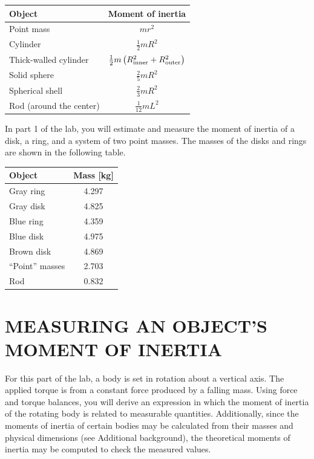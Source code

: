 \documentclass[11pt,letterpaper]{article}
\begin{document}
\renewcommand{\arraystretch}{2}
\begin{table}[h]
\begin{tabular}{|l|c|}
\hline
Object & Moment of inertia\\
\hline
Point mass & $mr^2$\\
Cylinder & $\frac{1}{2}mR^2$\\
Thick-walled cylinder & $\frac{1}{2}m\left(R_{\rm inner}^2+R_{\rm outer}^2\right)$\\
Solid sphere & $\frac{2}{5}mR^2$\\
Spherical shell & $\frac{2}{3}mR^2$\\
Rod (around the center) & $\frac{1}{12}mL^2$\\
\hline
\end{tabular}
\end{table}

In part 1 of the lab, you will estimate and measure the moment of inertia of a disk, a ring, and a system of two point masses. The masses of the disks and rings are shown in the following table.
\begin{table}[h]
\begin{tabular}{|l|c|}
\hline
Object & Mass [kg]\\
\hline
Gray ring & 4.297\\
Gray disk & 4.825\\
Blue ring & 4.359\\
Blue disk & 4.975\\
Brown disk & 4.869\\
``Point'' masses & 2.703\\
Rod & 0.832\\
\hline
\end{tabular}
\end{table}


\section{MEASURING AN OBJECT'S MOMENT OF INERTIA}
For this part of the lab, a body is set in rotation about a vertical axis.  The applied
torque is from a constant force produced by a falling mass. Using force and torque balances, you will derive an expression in which the moment of inertia of the rotating body is related to measurable quantities. Additionally, since the moments of inertia of certain bodies may be calculated from their masses and physical dimensions (see Additional background), the theoretical moments of inertia may be computed to check the measured values.
\end{document}
